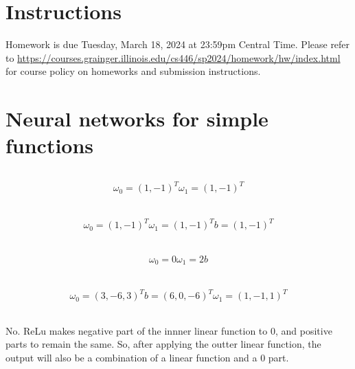 \documentclass[12pt]{article}
\begin{document}
\singlespacing

\renewcommand{\familydefault}{\rmdefault}


\section{Instructions}

Homework is due Tuesday, March 18, 2024 at 23:59pm Central Time.
Please refer to \url{https://courses.grainger.illinois.edu/cs446/sp2024/homework/hw/index.html} for course policy on homeworks and submission instructions.

\section{Neural networks for simple functions}
\subsection{}
\begin{eqnarray}
    \omega_{0} = (1, -1)^T  \omega_{1} = (1, -1)^T \nonumber
\end{eqnarray}

\subsection{}
\begin{eqnarray}
    \omega_{0} = (1, -1)^T  \omega_{1} = (1, -1)^T b = (1, -1)^T \nonumber
\end{eqnarray}

\subsection{}
\begin{eqnarray}
    \omega_{0} = 0  \omega_{1} = 2b  \nonumber
\end{eqnarray}

\subsection{}
\begin{eqnarray}
    \omega_{0} = (3, -6, 3)^T b = (6, 0, -6)^T \omega_{1} = (1, -1, 1)^T \nonumber
\end{eqnarray}

\subsection{}
No. ReLu makes negative part of the innner linear function to 0, and positive parts to remain the same. So, after applying the outter linear function, the output will also be a combination of a linear function and a 0 part.
\end{document}
